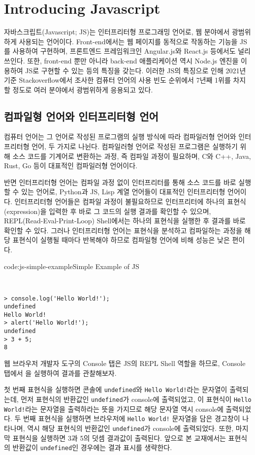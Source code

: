 \section{Introducing Javascript} \label{sect:introducing-javascript}

자바스크립트(Javascript; JS)는 인터프리터형 프로그래밍 언어로, 웹 분야에서 광범위하게 사용되는 언어이다. Front-end에서는 웹 페이지를 동적으로 작동하는 기능을 JS를 사용하여 구현하며, 프론트엔드 프레임워크인 Angular.js와 React.js 등에서도 널리 쓰인다. 또한, front-end 뿐만 아니라 back-end 애플리케이션 역시 Node.js 엔진을 이용하여 JS로 구현할 수 있는 등의 특징을 갖는다. 이러한 JS의 특징으로 인해 2021년 기준 Stackoverflow에서 조사한 컴퓨터 언어의 사용 빈도 순위에서 7년째 1위를 차지할 정도로 여러 분야에서 광범위하게 응용되고 있다.

\subsection*{컴파일형 언어와 인터프리터형 언어}

컴퓨터 언어는 그 언어로 작성된 프로그램의 실행 방식에 따라 컴파일러형 언어와 인터프리터형 언어, 두 가지로 나뉜다. 컴파일러형 언어로 작성된 프로그램은 실행하기 위해 소스 코드를 기계어로 변환하는 과정, 즉 컴파일 과정이 필요하며, C와 C++, Java, Rust, Go 등이 대표적인 컴파일러형 언어이다.

반면 인터프리터형 언어는 컴파일 과정 없이 인터프리터를 통해 소스 코드를 바로 실행할 수 있는 언어로, Python과 JS, Lisp 계열 언어들이 대표적인 인터프리터형 언어이다. 인터프리터형 언어들은 컴파일 과정이 불필요하므로 인터프리터에 하나의 표현식(expression)을 입력한 후 바로 그 코드의 실행 결과를 확인할 수 있으며, REPL(Read-Eval-Print-Loop) Shell에서는 하나의 표현식을 실행한 후 결과를 바로 확인할 수 있다. 그러나 인터프리터형 언어는 표현식을 분석하고 컴파일하는 과정을 해당 표현식이 실행될 때마다 반복해야 하므로 컴파일형 언어에 비해 성능은 낮은 편이다.

\begin{codeenv}{code:js-simple-example}{Simple Example of JS}\begin{verbatim}


> console.log('Hello World!');
undefined
Hello World!
> alert('Hello World!');
undefined
> 3 + 5;
8
\end{verbatim}
\end{codeenv}

웹 브라우저 개발자 도구의 Console 탭은 JS의 REPL Shell 역할을 하므로, Console 탭에서 을 실행하여 결과를 관찰해보자.

첫 번째 표현식을 실행하면 콘솔에 \texttt{undefined}와 \texttt{Hello World!}라는 문자열이 출력되는데, 먼저 표현식의 반환값인 \texttt{undefined}가 console에 출력되었고, 이 표현식이 \texttt{Hello World!}라는 문자열을 출력하라는 뜻을 가지므로 해당 문자열 역시 console에 출력되었다. 두 번째 표현식을 실행하면 브라우저에 \texttt{Hello World!} 문자열을 담은 경고창이 나타나며, 역시 해당 표현식의 반환값인 \texttt{undefined}가 console에 출력되었다. 또한, 마지막 표현식을 실행하면 3과 5의 덧셈 결과값이 출력된다. 앞으로 본 교재에서는 표현식의 반환값이 \texttt{undefined}인 경우에는 결과 표시를 생략한다.
